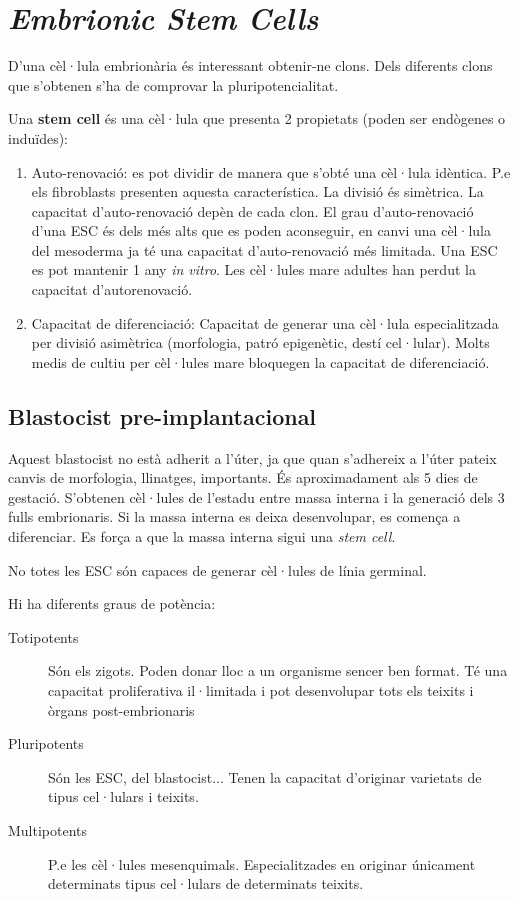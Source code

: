 \section{\textit{Embrionic Stem Cells}}
D'una cèl·lula embrionària és interessant obtenir-ne clons. Dels diferents clons que s'obtenen s'ha de comprovar la pluripotencialitat.

Una \textbf{stem cell} és una cèl·lula que presenta 2 propietats (poden ser endògenes o induïdes):
\begin{enumerate}
\item Auto-renovació: es pot dividir de manera que s'obté una cèl·lula idèntica. P.e els fibroblasts presenten aquesta característica. La divisió és simètrica. La capacitat d'auto-renovació depèn de cada clon. El grau d'auto-renovació d'una ESC és dels més alts que es poden aconseguir, en canvi una cèl·lula del mesoderma ja té una capacitat d'auto-renovació més limitada. Una ESC es pot mantenir 1 any \textit{in vitro}. Les cèl·lules mare adultes han perdut la capacitat d'autorenovació.

\item Capacitat de diferenciació: Capacitat de generar una cèl·lula especialitzada per divisió asimètrica (morfologia, patró epigenètic, destí cel·lular). Molts medis de cultiu per cèl·lules mare bloquegen la capacitat de diferenciació.
\end{enumerate}

\subsection{Blastocist pre-implantacional}
Aquest blastocist no està adherit a l'úter, ja que quan s'adhereix a l'úter pateix canvis de morfologia, llinatges, importants. És aproximadament als 5 dies de gestació. S'obtenen cèl·lules de l'estadu entre massa interna i la generació dels 3 fulls embrionaris. Si la massa interna es deixa desenvolupar, es comença a diferenciar. Es força a que la massa interna sigui una \textit{stem cell}.

No totes les ESC són capaces de generar cèl·lules de línia germinal.

Hi ha diferents graus de potència:
\begin{description}
\item[Totipotents] Són els zigots. Poden donar lloc a un organisme sencer ben format. Té una capacitat proliferativa il·limitada i pot desenvolupar tots els teixits i òrgans post-embrionaris

\item[Pluripotents] Són les ESC, del blastocist... Tenen la capacitat d'originar varietats de tipus cel·lulars i teixits.

\item[Multipotents] P.e les cèl·lules mesenquimals. Especialitzades en originar únicament determinats tipus cel·lulars de determinats teixits.
\end{description}

